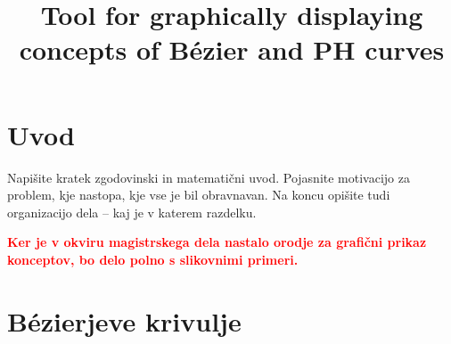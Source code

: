 \documentclass[isrm2, tisk]{fmfdelo}
\title{Tool for graphically displaying concepts of Bézier and PH curves}
\newcommand{\mycomment}[1]{\textbf{\textcolor{red}{#1}}}
\begin{document}
    \section{Uvod}
    Napišite kratek zgodovinski in matematični uvod. Pojasnite motivacijo za problem, kje
    nastopa, kje vse je bil obravnavan. Na koncu opišite tudi organizacijo dela -- kaj je v
    katerem razdelku.


    \mycomment{Ker je v okviru magistrskega dela nastalo orodje za grafični prikaz konceptov, bo delo polno s slikovnimi primeri.}

    \newpage


    \section{Bézierjeve krivulje}\label{sec:bezierjeve-krivulje}
\end{document}
